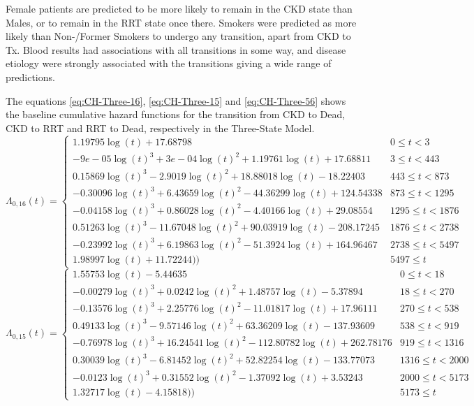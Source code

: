 \documentclass[12pt,PhD,twoside,openright]{muthesis}
\begin{document}
Female patients are predicted to be more likely to remain in the CKD state than Males, or to remain in the RRT state once there. Smokers were predicted as more likely than Non-/Former Smokers to undergo any transition, apart from CKD to Tx. Blood results had associations with all transitions in some way, and disease etiology were strongly associated with the transitions giving a wide range of predictions.

The equations \eqref{eq:CH-Three-16}, \eqref{eq:CH-Three-15} and \eqref{eq:CH-Three-56} shows the baseline cumulative hazard functions for the transition from CKD to Dead, CKD to RRT and RRT to Dead, respectively in the Three-State Model.
\begin{equation}
\Lambda_{0,16}(t)=\begin{cases} 1.19795\log(t)+17.68798 & 0 \le t < 3 \\ -9e-05\log(t)^3+3e-04\log(t)^2+1.19761\log(t)+17.68811 & 3 \le t < 443 \\ 0.15869\log(t)^3-2.9019\log(t)^2+18.88018\log(t)-18.22403 & 443 \le t < 873 \\ -0.30096\log(t)^3+6.43659\log(t)^2-44.36299\log(t)+124.54338 & 873 \le t < 1295 \\ -0.04158\log(t)^3+0.86028\log(t)^2-4.40166\log(t)+29.08554 & 1295 \le t < 1876 \\ 0.51263\log(t)^3-11.67048\log(t)^2+90.03919\log(t)-208.17245 & 1876 \le t < 2738 \\ -0.23992\log(t)^3+6.19863\log(t)^2-51.3924\log(t)+164.96467 & 2738 \le t < 5497 \\ 1.98997\log(t)+11.72244)) & 5497 \le t \label{eq:CH-Three-16}\end{cases}
\end{equation}
\begin{equation}
\Lambda_{0,15}(t)=\begin{cases} 1.55753\log(t)-5.44635 & 0 \le t < 18 \\ -0.00279\log(t)^3+0.0242\log(t)^2+1.48757\log(t)-5.37894 & 18 \le t < 270 \\ -0.13576\log(t)^3+2.25776\log(t)^2-11.01817\log(t)+17.96111 & 270 \le t < 538 \\ 0.49133\log(t)^3-9.57146\log(t)^2+63.36209\log(t)-137.93609 & 538 \le t < 919 \\ -0.76978\log(t)^3+16.24541\log(t)^2-112.80782\log(t)+262.78176 & 919 \le t < 1316 \\ 0.30039\log(t)^3-6.81452\log(t)^2+52.82254\log(t)-133.77073 & 1316 \le t < 2000 \\ -0.0123\log(t)^3+0.31552\log(t)^2-1.37092\log(t)+3.53243 & 2000 \le t < 5173 \\ 1.32717\log(t)-4.15818)) & 5173 \le t \label{eq:CH-Three-15}\end{cases}
\end{equation}
\end{document}
